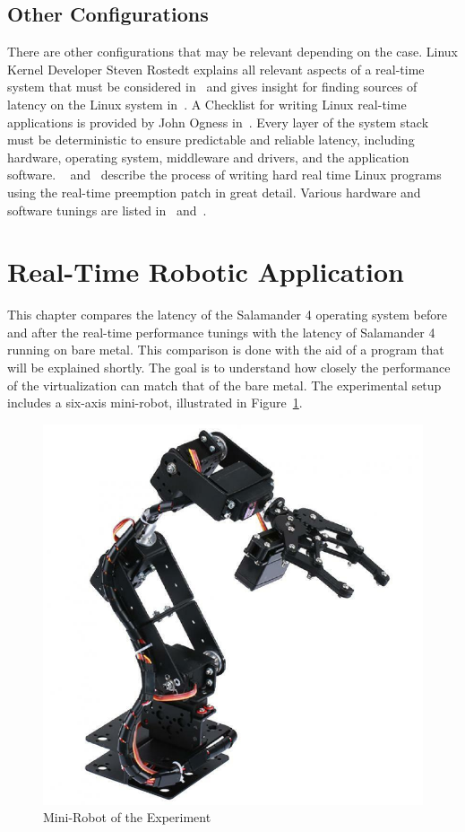 \documentclass[MMR,Master,english]{twbook}
\begin{document}
\subsection{Other Configurations}
There are other configurations that may be relevant depending on the case. Linux Kernel Developer Steven Rostedt explains all relevant aspects of a real-time system that must be considered in~\cite{kernelrecipesKernelRecipes20162016} and gives insight for finding sources of latency on the Linux system in~\cite{thelinuxfoundationFindingSourcesLatency2020}. A Checklist for writing Linux real-time applications is provided by John Ogness in~\cite{thelinuxfoundationChecklistWritingLinux2020}. Every layer of the system stack must be deterministic to ensure predictable and reliable latency, including hardware, operating system, middleware and drivers, and the application software. ~\cite{HOWTOBuildRTapplication} and~\cite{RealtimeProgrammingLinux} describe the process of writing hard real time Linux programs using the real-time preemption patch in great detail. Various hardware and software tunings are listed in~\cite{KVMQemuVirtualization} and~\cite{RealTimePerformanceTuning2022}.

\clearpage

\section{Real-Time Robotic Application}\label{sec:robotic_application}
This chapter compares the latency of the Salamander 4 operating system before and after the real-time performance tunings with the latency of Salamander 4 running on bare metal. This comparison is done with the aid of a program that will be explained shortly. The goal is to understand how closely the performance of the virtualization can match that of the bare metal. The experimental setup includes a six-axis mini-robot, illustrated in Figure~\ref{fig:mini_robot}.

\begin{figure}[H]
	\centering
	\includegraphics[width=0.3\columnwidth]{img/experiment/mini_robot.jpg}
	\caption[Mini-Robot of the Experiment]{Mini-Robot of the Experiment~\cite{6DFRoboticArm}}
	\label{fig:mini_robot}
\end{figure}
\end{document}
